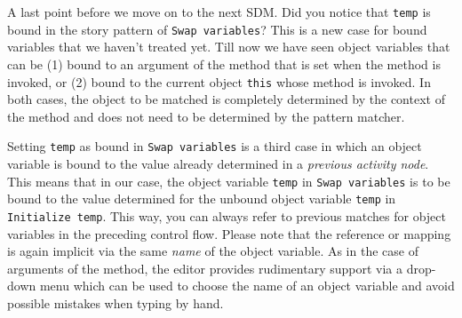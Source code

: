 A last point before we move on to the next SDM.  Did you notice that
\texttt{temp} is bound in the story pattern of \texttt{Swap variables}?  This is
a new case for bound variables that we haven't treated yet.  Till now we have
seen object variables that can be (1) bound to an argument of the method that is
set when the method is invoked, or (2) bound to the current object
\texttt{this} whose method is invoked.  In both cases, the object to be matched
is completely determined by the context of the method and does not need to be
determined by the pattern matcher.  

Setting \texttt{temp} as bound in
\texttt{Swap variables} is a third case in which an object variable is bound
to the value already determined in a \emph{previous activity node}.  This means
that in our case, the object variable \texttt{temp} in \texttt{Swap variables}
is to be bound to the value determined for the unbound object variable
\texttt{temp} in \texttt{Initialize temp}.  This way, you can always refer to
previous matches for object variables in the preceding control flow.  Please
note that the reference or mapping is again implicit via the same \emph{name} of
the object variable.  As in the case of arguments of the method, the editor
provides rudimentary support via a drop-down menu which can be used
to choose the name of an object variable and avoid possible mistakes when
typing by hand.
